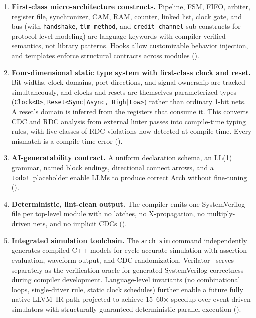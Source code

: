 \documentclass[manuscript]{acmart}
\begin{document}
\begin{enumerate}
\item \textbf{First-class micro-architecture constructs.} Pipeline, FSM, FIFO, arbiter, register file, synchronizer, CAM, RAM, counter, linked list, clock gate, and bus (with \texttt{handshake}, \texttt{tlm\_method}, and \texttt{credit\_channel} sub-constructs for protocol-level modeling) are language keywords with compiler-verified semantics, not library patterns. Hooks allow customizable behavior injection, and templates enforce structural contracts across modules ().

\item \textbf{Four-dimensional static type system with first-class clock and reset.} Bit widths, clock domains, port directions, and signal ownership are tracked simultaneously, and clocks and resets are themselves parameterized types (\texttt{Clock<D>}, \texttt{Reset<Sync|Async, High|Low>}) rather than ordinary 1-bit nets. A reset's domain is inferred from the registers that consume it. This converts CDC and RDC analysis from external linter passes into compile-time typing rules, with five classes of RDC violations now detected at compile time. Every mismatch is a compile-time error ().

\item \textbf{AI-generatability contract.} A uniform declaration schema, an LL(1) grammar, named block endings, directional connect arrows, and a \texttt{todo!}\ placeholder enable LLMs to produce correct Arch without fine-tuning ().

\item \textbf{Deterministic, lint-clean output.} The compiler emits one SystemVerilog file per top-level module with no latches, no X-propagation, no multiply-driven nets, and no implicit CDCs ().

\item \textbf{Integrated simulation toolchain.} The \texttt{arch sim} command independently generates compiled C++ models for cycle-accurate simulation with assertion evaluation, waveform output, and CDC randomization. Verilator~\cite{verilator} serves separately as the verification oracle for generated SystemVerilog correctness during compiler development. Language-level invariants (no combinational loops, single-driver rule, static clock schedules) further enable a future fully native LLVM~IR path projected to achieve 15--60$\times$ speedup over event-driven simulators with structurally guaranteed deterministic parallel execution ().
\end{enumerate}
\end{document}
